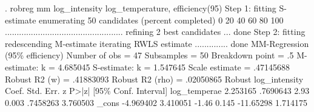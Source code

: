 . robreg mm log_intensity log_temperature, efficiency(95)
{\smallskip}
Step 1: fitting S-estimate
{\smallskip}
enumerating 50 candidates (percent completed)
0  20  40  60  80  100
..................................................
{\smallskip}
refining 2 best candidates ... done
{\smallskip}
Step 2: fitting redescending M-estimate
{\smallskip}
iterating RWLS estimate .............. done
{\smallskip}
MM-Regression (95\% efficiency)                  Number of obs     =         47
                                                  Subsamples      =         50
                                                  Breakdown point =         .5
                                                  M-estimate: k   =   4.685045
                                                  S-estimate: k   =   1.547645
                                                  Scale estimate  =  .47145688
                                                  Robust R2 (w)   =  .41883093
                                                  Robust R2 (rho) =  .02050865
{\smallskip}
              {\VBAR}               Robust
log_intensity {\VBAR}      Coef.   Std. Err.      z    P>|z|     [95\% Conf. Interval]
log_tempera{\tytilde}e {\VBAR}   2.253165   .7690643     2.93   0.003     .7458263    3.760503
        _cons {\VBAR}  -4.969402   3.410051    -1.46   0.145    -11.65298    1.714175
{\smallskip}
